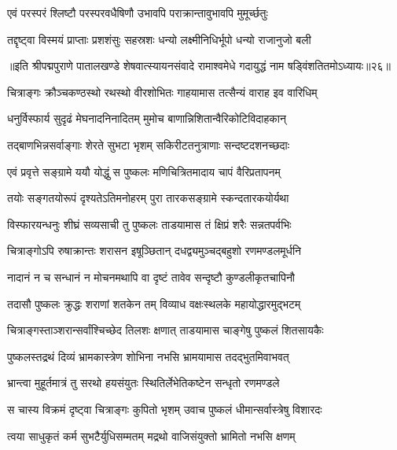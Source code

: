 \twolineshloka
{एवं परस्परं श्लिष्टौ परस्परवधैषिणौ}
{उभावपि पराक्रान्तावुभावपि मुमूर्च्छतुः}%

\twolineshloka
{तद्दृष्ट्वा विस्मयं प्राप्ताः प्रशशंसुः सहस्रशः}
{धन्यो लक्ष्मीनिधिर्भूपो धन्यो राजानुजो बली}%

{॥इति श्रीपद्मपुराणे पातालखण्डे शेषवात्स्यायनसंवादे रामाश्वमेधे गदायुद्धं नाम षड्विंशतितमोऽध्यायः॥२६॥}



\twolineshloka
{चित्राङ्गः क्रौञ्चकण्ठस्थो रथस्थो वीरशोभितः}
{गाहयामास तत्सैन्यं वाराह इव वारिधिम्}%

\twolineshloka
{धनुर्विस्फार्य सुदृढं मेघनादनिनादितम्}
{मुमोच बाणान्निशितान्वैरिकोटिविदाहकान्}%

\twolineshloka
{तद्बाणभिन्नसर्वाङ्गाः शेरते सुभटा भृशम्}
{सकिरीटतनुत्राणाः सन्दष्टदशनच्छदाः}%

\twolineshloka
{एवं प्रवृत्ते सङ्ग्रामे ययौ योद्धुं स पुष्कलः}
{मणिचित्रितमादाय चापं वैरिप्रतापनम्}%

\twolineshloka
{तयोः सङ्गतयोरूपं दृश्यतेऽतिमनोहरम्}
{पुरा तारकसङ्ग्रामे स्कन्दतारकयोर्यथा}%

\twolineshloka
{विस्फारयन्धनुः शीघ्रं सव्यसाची तु पुष्कलः}
{ताडयामास तं क्षिप्रं शरैः सन्नतपर्वभिः}%

\twolineshloka
{चित्राङ्गोऽपि रुषाक्रान्तः शरासन इषूञ्छितान्}
{दधद्व्यमुञ्चद्बहुशो रणमण्डलमूर्धनि}%

\twolineshloka
{नादानं न च सन्धानं न मोचनमथापि वा}
{दृष्टं तावेव सन्दृष्टौ कुण्डलीकृतचापिनौ}%

\twolineshloka
{तदासौ पुष्कलः क्रुद्धः शराणां शतकेन तम्}
{विव्याध वक्षःस्थलके महायोद्धारमुद्भटम्}%

\twolineshloka
{चित्राङ्गस्ताञ्शरान्सर्वांश्चिच्छेद तिलशः क्षणात्}
{ताडयामास चाङ्गेषु पुष्कलं शितसायकैः}%

\twolineshloka
{पुष्कलस्तद्रथं दिव्यं भ्रामकास्त्रेण शोभिना}
{नभसि भ्रामयामास तदद्भुतमिवाभवत्}%

\twolineshloka
{भ्रान्त्वा मुहूर्तमात्रं तु सरथो हयसंयुतः}
{स्थितिर्लेभेतिकष्टेन सन्धृतो रणमण्डले}%

\twolineshloka
{स चास्य विक्रमं दृष्ट्वा चित्राङ्गः कुपितो भृशम्}
{उवाच पुष्कलं धीमान्सर्वास्त्रेषु विशारदः}%


\twolineshloka
{त्वया साधुकृतं कर्म सुभटैर्युधिसम्मतम्}
{मद्रथो वाजिसंयुक्तो भ्रामितो नभसि क्षणम्}%

